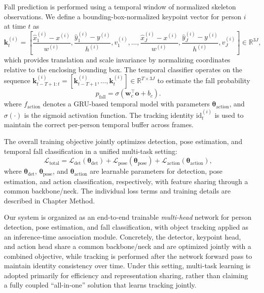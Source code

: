 Fall prediction is performed using a temporal window of normalized skeleton observations. We define a bounding-box-normalized keypoint vector for person $i$ at time $t$ as
\begin{equation}
\label{eq:normalized_kp}
\mathbf{k}_t^{(i)} =
\left[
\frac{\hat{x}_1^{(i)}-x^{(i)}}{w^{(i)}},
\frac{\hat{y}_1^{(i)}-y^{(i)}}{h^{(i)}},
v_1^{(i)},
\ldots,
\frac{\hat{x}_J^{(i)}-x^{(i)}}{w^{(i)}},
\frac{\hat{y}_J^{(i)}-y^{(i)}}{h^{(i)}},
v_J^{(i)}
\right]
\in \mathbb{R}^{3J},
\end{equation}
which provides translation and scale invariance by normalizing coordinates relative to the enclosing bounding box. The temporal classifier operates on the sequence
$\mathbf{k}_{t-T+1:t}^{(i)}=[\mathbf{k}_{t-T+1}^{(i)},\ldots,\mathbf{k}_t^{(i)}]\in\mathbb{R}^{T\times 3J}$
to estimate the fall probability
\begin{equation}
    p_\text{fall} = \sigma(\mathbf{w}_c^\top \mathbf{o} + b_c).
    \label{eq:fall_prob_v1}
\end{equation}
where $f_{\text{action}}$ denotes a GRU-based temporal model with parameters $\boldsymbol{\theta}_{\text{action}}$, and $\sigma(\cdot)$ is the sigmoid activation function. The tracking identity $\mathrm{id}_t^{(i)}$ is used to maintain the correct per-person temporal buffer across frames.

The overall training objective jointly optimizes detection, pose estimation, and temporal fall classification in a unified multi-task setting:
\begin{equation}
\label{eq:total_loss}
\mathcal{L}_{\text{total}}
=
\mathcal{L}_{\text{det}}(\boldsymbol{\theta}_{\text{det}})
+
\mathcal{L}_{\text{pose}}(\boldsymbol{\theta}_{\text{pose}})
+
\mathcal{L}_{\text{action}}(\boldsymbol{\theta}_{\text{action}}),
\end{equation}
where $\boldsymbol{\theta}_{\text{det}}$, $\boldsymbol{\theta}_{\text{pose}}$, and $\boldsymbol{\theta}_{\text{action}}$ are learnable parameters for detection, pose estimation, and action classification, respectively, with feature sharing through a common backbone/neck. The individual loss terms and training details are described in Chapter Method.

Our system is organized as an end-to-end trainable \emph{multi-head} network for person detection, pose estimation, and fall classification, with object tracking applied as an inference-time association module. Concretely, the detector, keypoint head, and action head share a common backbone/neck and are optimized jointly with a combined objective, while tracking is performed after the network forward pass to maintain identity consistency over time. Under this setting, multi-task learning is adopted primarily for efficiency and representation sharing, rather than claiming a fully coupled ``all-in-one'' solution that learns tracking jointly.


